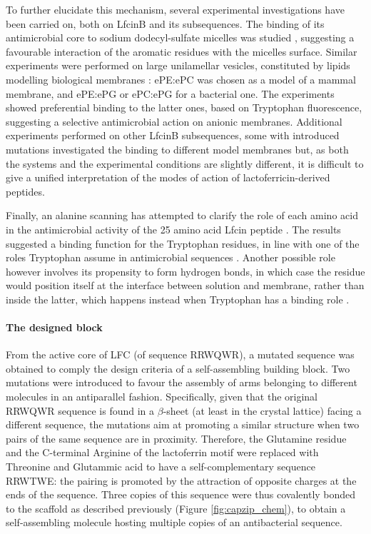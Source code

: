 To further elucidate this mechanism, several experimental investigations have been carried on, both on LfcinB and its subsequences. The binding of its antimicrobial core to sodium dodecyl-sulfate micelles was studied \citep{Schibli1999}, suggesting a favourable interaction of the aromatic residues with the micelles surface.
%
Similar experiments were performed on large unilamellar vesicles, constituted by lipids modelling biological membranes \citep{Nguyen2005}: ePE:ePC was chosen as a model of a mammal membrane, and ePE:ePG or ePC:ePG for a bacterial one. The experiments showed preferential binding to the latter ones, based on Tryptophan fluorescence, suggesting a selective antimicrobial action on anionic membranes.
%
Additional experiments performed on other LfcinB subsequences, some with introduced mutations\citep{Tsutsumi2012,Arseneault2010} investigated the binding to different model membranes but, as both the systems and the experimental conditions are slightly different, it is difficult to give a unified interpretation of the modes of action of lactoferricin-derived peptides.

Finally, an alanine scanning has attempted to clarify the role of each amino acid in the antimicrobial activity of the 25 amino acid Lfcin peptide \citep{Strom2002}. The results suggested a binding function for the Tryptophan residues, in line with one of the roles Tryptophan assume in antimicrobial sequences \citep{Chan2006}.
%
Another possible role however involves its propensity to form hydrogen bonds, in which case the residue would position itself at the interface between solution and membrane, rather than inside the latter, which happens instead when Tryptophan has a binding role \citep{Chan2006}.

\paragraph{The designed block}
From the active core of LFC (of sequence RRWQWR), a mutated sequence was obtained to comply the design criteria of a self-assembling building block. Two mutations were introduced to favour the assembly of arms belonging to different molecules in an antiparallel fashion. Specifically, given that the original RRWQWR sequence is found in a $\beta$-sheet (at least in the crystal lattice) facing a different sequence, the mutations aim at promoting a similar structure when two pairs of the same sequence are in proximity. Therefore, the Glutamine residue and the C-terminal Arginine of the lactoferrin motif were replaced with Threonine and Glutammic acid to have a self-complementary sequence RRWTWE: the pairing is promoted by the attraction of opposite charges at the ends of the sequence.
%
Three copies of this sequence were thus covalently bonded to the scaffold as described previously (Figure \ref{fig:capzip_chem}), to obtain a self-assembling molecule hosting multiple copies of an antibacterial sequence.

